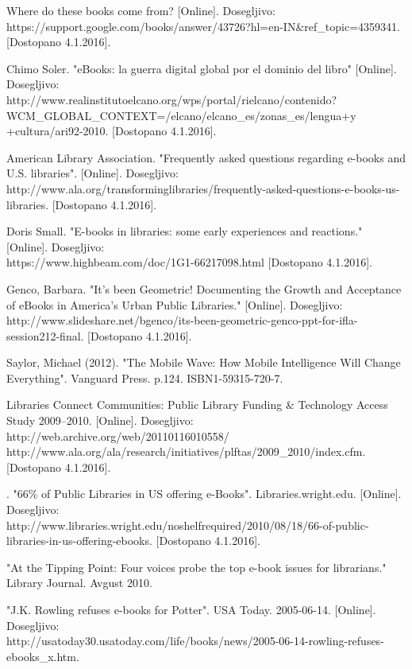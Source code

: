 \documentclass[a4paper, 12pt]{book}
\begin{document}
\begin{thebibliography}{99}
 Where do these books come from?
[Online]. Dosegljivo:\\ https://support.google.com/books/answer/43726?hl=en-IN\&ref\_topic=4359341.
[Dostopano 4.1.2016].

 Chimo Soler. "eBooks: la guerra digital global por el dominio del libro"
[Online]. Dosegljivo:\\ http://www.realinstitutoelcano.org/wps/portal/rielcano/contenido?
WCM\_GLOBAL\_CONTEXT=/elcano/elcano\_es/zonas\_es/lengua+y
+cultura/ari92-2010.
[Dostopano 4.1.2016].

 American Library Association. "Frequently asked questions regarding e-books and U.S. libraries".
[Online]. Dosegljivo:\\ http://www.ala.org/transforminglibraries/frequently-asked-questions-e-books-us-libraries.
[Dostopano 4.1.2016].

 Doris Small. "E-books in libraries: some early experiences and reactions."
[Online]. Dosegljivo:\\ https://www.highbeam.com/doc/1G1-66217098.html
[Dostopano 4.1.2016].
 
 Genco, Barbara. "It's been Geometric! Documenting the Growth and Acceptance of eBooks in America's Urban Public Libraries." 
[Online]. Dosegljivo:\\ http://www.slideshare.net/bgenco/its-been-geometric-genco-ppt-for-ifla-session212-final.
[Dostopano 4.1.2016].

 Saylor, Michael (2012). "The Mobile Wave: How Mobile Intelligence Will Change Everything". Vanguard Press. p.124. ISBN1-59315-720-7. 

 Libraries Connect Communities: Public Library Funding \& Technology Access Study 2009–2010.
[Online]. Dosegljivo:\\ http://web.archive.org/web/20110116010558/
http://www.ala.org/ala/research/initiatives/plftas/2009\_2010/index.cfm.
[Dostopano 4.1.2016].

. "66\% of Public Libraries in US offering e-Books". Libraries.wright.edu.
[Online]. Dosegljivo:\\ http://www.libraries.wright.edu/noshelfrequired/2010/08/18/66-of-public-libraries-in-us-offering-ebooks.
[Dostopano 4.1.2016].

 "At the Tipping Point: Four voices probe the top e-book issues for librarians." Library Journal. Avgust 2010.

 "J.K. Rowling refuses e-books for Potter". USA Today. 2005-06-14. 
[Online]. Dosegljivo:\\ http://usatoday30.usatoday.com/life/books/news/2005-06-14-rowling-refuses-ebooks\_x.htm.


\end{thebibliography}
\end{document}

